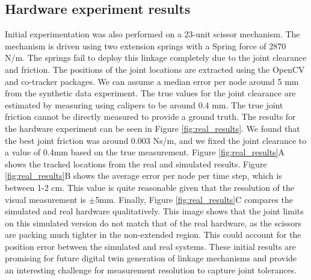 \subsection{Hardware experiment results}
Initial experimentation was also performed on a 23-unit scissor mechanism. The mechanism is driven using two extension springs with a Spring force of 2870 N/m. The springs fail to deploy this linkage completely due to the joint clearance and friction. The positions of the joint locations are extracted using the OpenCV and co-tracker packages. We can assume a median error per node around 5 mm from the synthetic data experiment. The true values for the joint clearance are estimated by measuring using calipers to be around 0.4 mm. The true joint friction cannot be directly measured to provide a ground truth. The results for the hardware experiment can be seen in Figure \ref{fig:real_results}. We found that the best joint friction was around 0.003 Ns/m, and we fixed the joint clearance to a value of 0.4mm based on the true measurement. Figure \ref{fig:real_results}A shows the tracked locations from the real and simulated results. Figure \ref{fig:real_results}B shows the average error per node per time step, which is between 1-2 cm. This value is quite reasonable given that the resolution of the visual measurement is $\pm$5mm. Finally, Figure \ref{fig:real_results}C compares the simulated and real hardware qualitatively. This image shows that the joint limits on this simulated version do not match that of the real hardware, as the scissors are packing much tighter in the non-extended region. This could account for the position error between the simulated and real systems. These initial results are promising for future digital twin generation of linkage mechanisms and provide an interesting challenge for measurement resolution to capture joint tolerances. 

